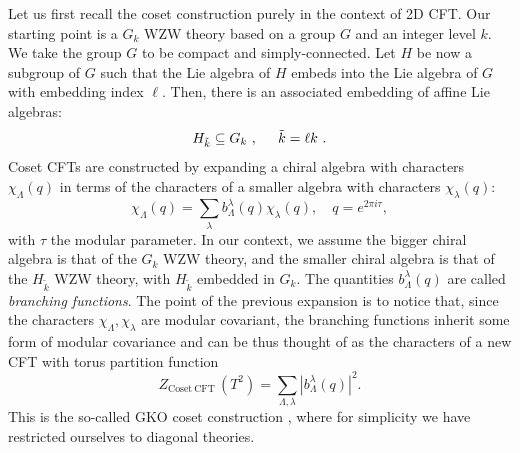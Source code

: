\documentclass[11pt]{article}
\numberwithin{equation}{section}
\begin{document}
Let us first recall the coset construction purely in the context of 2D CFT. Our starting point is a $G_{k}$ WZW theory based on a group $G$ and an integer level $k$. We take the group $G$ to be compact and simply-connected. Let $H$ be now a subgroup of $G$ such that the Lie algebra of $H$ embeds into the Lie algebra of $G$ with embedding index $\ell$. Then, there is an associated embedding of affine Lie algebras:
\begin{equation}
    H_{\tilde{k}} \subseteq G_{k}~, \hspace{.2in}\tilde{k}=\ell k~.
\end{equation}
 Coset CFTs are constructed by expanding a chiral algebra with characters $\chi_{\Lambda}(q)$ in terms of the characters of a smaller algebra with characters $\chi_{\lambda}(q)$:
\begin{equation} \label{branchingrules}
    \chi_{\Lambda}(q) = \sum_{\lambda} b_{\Lambda}^{\lambda}(q) \chi_{\lambda}(q), \quad q=e^{2 \pi i \tau},
\end{equation}
with $\tau$ the modular parameter. In our context, we assume the bigger chiral algebra is that of the $G_{k}$ WZW theory, and the smaller chiral algebra is that of the $H_{\tilde{k}}$ WZW theory, with $H_{\tilde{k}}$ embedded in $G_{k}$. The quantities $b_{\Lambda}^{\lambda}(q)$ are called \emph{branching functions}. The point of the previous expansion is to notice that, since the characters $\chi_{\Lambda}, \chi_{\lambda}$ are modular covariant, the branching functions inherit some form of modular covariance and can be thus thought of as the characters of a new CFT with torus partition function
\begin{equation}
    Z_{\mathrm{Coset \ CFT}} \, (T^{2}) = \sum_{\Lambda,\lambda} |b_{\Lambda}^{\lambda}(q)|^{2}. \label{cosetpartitionfunction}
\end{equation}
This is the so-called GKO coset construction \cite{Goddard:1984vk, Goddard:1986ee}, where for simplicity we have restricted ourselves to diagonal theories. 
\end{document}
